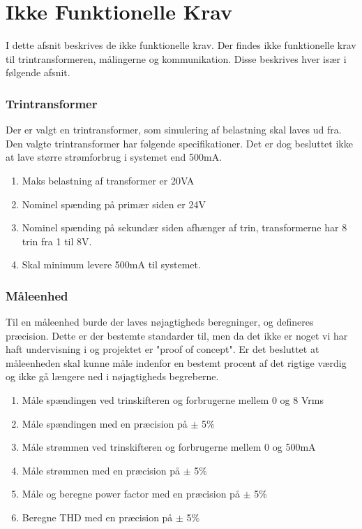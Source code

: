 
\section{Ikke Funktionelle Krav}
I dette afsnit beskrives de ikke funktionelle krav. Der findes ikke funktionelle krav til trintransformeren, målingerne og kommunikation. Disse beskrives hver især i følgende afsnit.

\subsubsection{Trintransformer}
Der er valgt en trintransformer, som simulering af belastning skal laves ud fra. Den valgte trintransformer har følgende specifikationer. Det er dog besluttet ikke at lave større strømforbrug i systemet end 500mA. 

\begin{enumerate}
	\item Maks belastning af transformer er 20VA
	\item Nominel spænding på primær siden er 24V
	\item Nominel spænding på sekundær siden afhænger af trin, transformerne har 8 trin fra 1 til 8V.
	\item Skal minimum levere 500mA til systemet. 
\end{enumerate}

\subsubsection{Måleenhed}
Til en måleenhed burde der laves nøjagtigheds beregninger, og defineres præcision. Dette er der bestemte standarder til, men da det ikke er noget vi har haft undervisning i og projektet er "proof of concept". Er det besluttet at måleenheden skal kunne måle indenfor en bestemt procent af det rigtige værdig og ikke gå længere ned i nøjagtigheds begreberne.

\begin{enumerate}
	\item Måle spændingen ved trinskifteren og forbrugerne mellem 0 og 8 Vrms
	\item Måle spændingen med en præcision på $\pm$ 5\%
	\item Måle strømmen ved trinskifteren og forbrugerne mellem 0 og 500mA
	\item Måle strømmen med en præcision på $\pm$ 5\%
	\item Måle og beregne power factor med en præcision på $\pm$ 5$\%$
	\item Beregne THD med en præcision på $\pm$ 5$\%$
\end{enumerate} 

